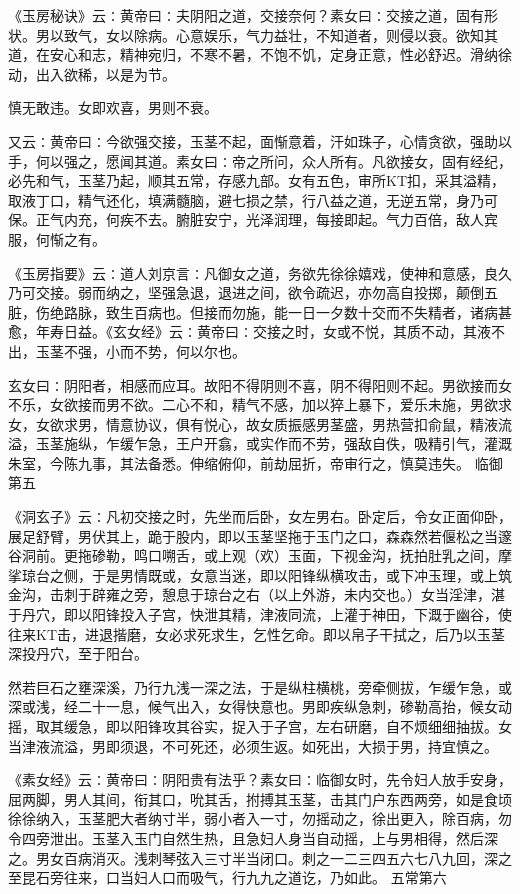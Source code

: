 \documentclass[a4paper,12pt,UTF8,twoside]{ctexbook}
\begin{document}
《玉房秘诀》云∶黄帝曰∶夫阴阳之道，交接奈何？素女曰∶交接之道，固有形状。男以致气，女以除病。心意娱乐，气力益壮，不知道者，则侵以衰。欲知其道，在安心和志，精神宛归，不寒不暑，不饱不饥，定身正意，性必舒迟。滑纳徐动，出入欲稀，以是为节。

慎无敢违。女即欢喜，男则不衰。

又云∶黄帝曰∶今欲强交接，玉茎不起，面惭意着，汗如珠子，心情贪欲，强助以手，何以强之，愿闻其道。素女曰∶帝之所问，众人所有。凡欲接女，固有经纪，必先和气，玉茎乃起，顺其五常，存感九部。女有五色，审所KT扣，采其溢精，取液丁口，精气还化，填满髓脑，避七损之禁，行八益之道，无逆五常，身乃可保。正气内充，何疾不去。腑脏安宁，光泽润理，每接即起。气力百倍，敌人宾服，何惭之有。

《玉房指要》云∶道人刘京言∶凡御女之道，务欲先徐徐嬉戏，使神和意感，良久乃可交接。弱而纳之，坚强急退，退进之间，欲令疏迟，亦勿高自投掷，颠倒五脏，伤绝路脉，致生百病也。但接而勿施，能一日一夕数十交而不失精者，诸病甚愈，年寿日益。《玄女经》云∶黄帝曰∶交接之时，女或不悦，其质不动，其液不出，玉茎不强，小而不势，何以尔也。

玄女曰∶阴阳者，相感而应耳。故阳不得阴则不喜，阴不得阳则不起。男欲接而女不乐，女欲接而男不欲。二心不和，精气不感，加以猝上暴下，爱乐未施，男欲求女，女欲求男，情意协议，俱有悦心，故女质振感男茎盛，男热营扣俞鼠，精液流溢，玉茎施纵，乍缓乍急，王户开翕，或实作而不劳，强敌自佚，吸精引气，灌溉朱室，今陈九事，其法备悉。伸缩俯仰，前劫屈折，帝审行之，慎莫违失。
临御第五

《洞玄子》云∶凡初交接之时，先坐而后卧，女左男右。卧定后，令女正面仰卧，展足舒臂，男伏其上，跪于股内，即以玉茎坚拖于玉门之口，森森然若偃松之当邃谷洞前。更拖碜勒，鸣口嗍舌，或上观（欢）玉面，下视金沟，抚拍肚乳之间，摩挲琼台之侧，于是男情既或，女意当迷，即以阳锋纵横攻击，或下冲玉理，或上筑金沟，击刺于辟雍之旁，憩息于琼台之右（以上外游，未内交也。）女当淫津，湛于丹穴，即以阳锋投入子宫，快泄其精，津液同流，上灌于神田，下溉于幽谷，使往来KT击，进退揩磨，女必求死求生，乞性乞命。即以帛子干拭之，后乃以玉茎深投丹穴，至于阳台。

然若巨石之壅深溪，乃行九浅一深之法，于是纵柱横桃，旁牵侧拔，乍缓乍急，或深或浅，经二十一息，候气出入，女得快意也。男即疾纵急刺，碜勒高抬，候女动摇，取其缓急，即以阳锋攻其谷实，捉入于子宫，左右研磨，自不烦细细抽拔。女当津液流溢，男即须退，不可死还，必须生返。如死出，大损于男，持宜慎之。

《素女经》云∶黄帝曰∶阴阳贵有法乎？素女曰∶临御女时，先令妇人放手安身，屈两脚，男人其间，衔其口，吮其舌，拊搏其玉茎，击其门户东西两旁，如是食顷徐徐纳入，玉茎肥大者纳寸半，弱小者入一寸，勿摇动之，徐出更入，除百病，勿令四旁泄出。玉茎入玉门自然生热，且急妇人身当自动摇，上与男相得，然后深之。男女百病消灭。浅刺琴弦入三寸半当闭口。刺之一二三四五六七八九回，深之至昆石旁往来，口当妇人口而吸气，行九九之道讫，乃如此。
五常第六
\end{document}
